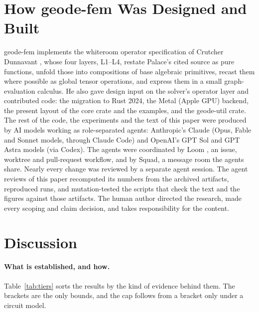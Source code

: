 \documentclass{anvil-paper}
\begin{document}
\section{How geode-fem Was Designed and Built}
\label{sec:built}

geode-fem implements the whiteroom operator specification of Crutcher
Dunnavant \citep{dunnavant2026whiteroom}, whose four layers, L1--L4,
restate Palace's cited source as pure functions, unfold those into
compositions of base algebraic primitives, recast them where possible as
global tensor operations, and express them in a small graph-evaluation
calculus. He also gave design
input on the solver's operator layer and contributed code: the migration to
Rust 2024, the Metal (Apple GPU) backend, the present layout of the core
crate and the examples, and the geode-util crate. The rest of the code, the
experiments and the text of this paper were produced by AI models
working as role-separated agents: Anthropic's Claude (Opus, Fable and
Sonnet models, through Claude Code) and OpenAI's GPT Sol and GPT Astra
models (via Codex). The agents were coordinated by Loom \citep{loom}, an
issue, worktree and pull-request workflow, and by Squad, a message room
the agents share.
Nearly every change was reviewed by a separate agent session. The agent
reviews of this paper recomputed its numbers from the archived artifacts,
reproduced runs, and mutation-tested the scripts that check the text and
the figures against those artifacts. The human author directed the
research, made every scoping and claim decision, and takes responsibility
for the content.

\section{Discussion}
\label{sec:discussion}

\paragraph{What is established, and how.}
Table~\ref{tab:tiers} sorts the results by the kind of evidence behind
them. The brackets are the only bounds, and the cap follows from a bracket
only under a circuit model.
\end{document}
